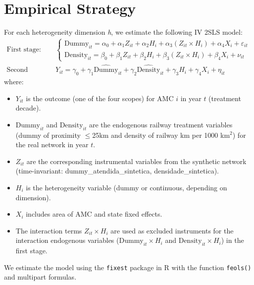 \documentclass{article}
\begin{document}
\section{Empirical Strategy}
For each heterogeneity dimension \textit{h}, we estimate the following IV 2SLS model:
\begin{align}
\text{First stage:} & \quad
\begin{cases}
\text{Dummy}_{it} = \alpha_0 + \alpha_1 Z_{it} + \alpha_2 H_i + \alpha_3 (Z_{it} \times H_i) + \alpha_4 X_i + \varepsilon_{it} \\
\text{Density}_{it} = \beta_0 + \beta_1 Z_{it} + \beta_2 H_i + \beta_3 (Z_{it} \times H_i) + \beta_4 X_i + \nu_{it}
\end{cases} \\
\text{Second stage:} & \quad
Y_{it} = \gamma_0 + \gamma_1 \widehat{\text{Dummy}}_{it} + \gamma_2 \widehat{\text{Density}}_{it} + \gamma_3 H_i + \gamma_4 X_i + \eta_{it}
\end{align}
where:
\begin{itemize}
\item $Y_{it}$ is the outcome (one of the four scopes) for AMC $i$ in year $t$ (treatment decade).
\item $\text{Dummy}_{it}$ and $\text{Density}_{it}$ are the endogenous railway treatment variables (dummy of proximity $\leq$25km and density of railway km per 1000 km$^2$) for the real network in year $t$.
\item $Z_{it}$ are the corresponding instrumental variables from the synthetic network (time-invariant: dummy\_atendida\_sintetica, densidade\_sintetica).
\item $H_i$ is the heterogeneity variable (dummy or continuous, depending on dimension).
\item $X_i$ includes area of AMC and state fixed effects.
\item The interaction terms $Z_{it} \times H_i$ are used as excluded instruments for the interaction endogenous variables ($\text{Dummy}_{it} \times H_i$ and $\text{Density}_{it} \times H_i$) in the first stage.
\end{itemize}
We estimate the model using the \texttt{fixest} package in R with the function \texttt{feols()} and multipart formulas.
\end{document}
